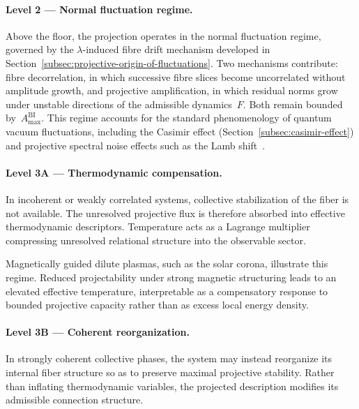   \paragraph{Level 2 --- Normal fluctuation regime.}

    Above the floor, the projection operates in the normal fluctuation regime, governed
    by the $\lambda$-induced fibre drift mechanism developed in
    Section~\ref{subsec:projective-origin-of-fluctuations}.
    Two mechanisms contribute: fibre decorrelation, in which successive fibre slices
    become uncorrelated without amplitude growth, and projective amplification, in which
    residual norms grow under unstable directions of the admissible dynamics~$F$.
    Both remain bounded by~$A^{\mathrm{BI}}_{\max}$.
    This regime accounts for the standard phenomenology of quantum vacuum fluctuations,
    including the Casimir effect (Section~\ref{subsec:casimir-effect})
    and projective spectral noise effects such as the Lamb shift~\cite{Beau2026f}.

  \paragraph{Level 3A --- Thermodynamic compensation.}

    In incoherent or weakly correlated systems,
    collective stabilization of the fiber is not available.
    The unresolved projective flux is therefore absorbed into
    effective thermodynamic descriptors.
    Temperature acts as a Lagrange multiplier compressing
    unresolved relational structure into the observable sector.

    Magnetically guided dilute plasmas, such as the solar corona, illustrate this regime.
    Reduced projectability under strong magnetic structuring
    leads to an elevated effective temperature,
    interpretable as a compensatory response to bounded projective capacity
    rather than as excess local energy density.

  \paragraph{Level 3B --- Coherent reorganization.}

    In strongly coherent collective phases,
    the system may instead reorganize its internal fiber structure
    so as to preserve maximal projective stability.
    Rather than inflating thermodynamic variables,
    the projected description modifies its admissible connection structure.

